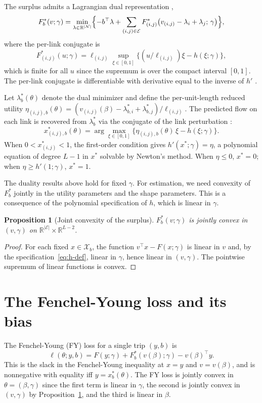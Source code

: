 \documentclass[12pt]{article}
\newcommand{\cN}{\mathcal{N}}
\newcommand{\cE}{\mathcal{E}}
\newcommand{\cX}{\mathcal{X}}
\newtheorem{proposition}{Proposition}
\begin{document}
The surplus admits a Lagrangian dual representation \citep[Theorem 2]{fosgerau_convex_2026},
\[
    F^*_b(v; \gamma) = \min_{\lambda \in \mathbb{R}^{|\cN|}}
    \Bigl\{ -b^\top \lambda + \sum_{(i,j) \in \cE}
    F^*_{(i,j)}\bigl(v_{(i,j)} - \lambda_i + \lambda_j;\,
    \gamma\bigr) \Bigr\},
\]
where the per-link conjugate is
\[
    F^*_{(i,j)}(u; \gamma)
    = \ell_{(i,j)} \sup_{\xi \in [0,1]} \bigl\{
        (u / \ell_{(i,j)})\xi - h(\xi; \gamma) \bigr\},
\]
which is finite for all $u$ since the supremum is over the compact interval $[0, 1]$. The per-link conjugate is differentiable with derivative equal to the inverse of $h'$ \citep[Lemma 1]{fosgerau_convex_2026}.

Let $\lambda^*_b(\theta)$ denote the dual minimizer and define the per-unit-length reduced utility $\eta_{(i,j),b}(\theta) = (v_{(i,j)}(\beta) - \lambda^*_{b,i} + \lambda^*_{b,j}) / \ell_{(i,j)}$. The predicted flow on each link is recovered from $\lambda^*_b$ via the conjugate of the link perturbation \citep[Theorem 3]{fosgerau_convex_2026}:
\[
    x^*_{(i,j),b}(\theta)
    = \arg\max_{\xi \in [0,1]} \bigl\{
        \eta_{(i,j),b}(\theta) \, \xi - h(\xi; \gamma) \bigr\}.
\]
When $0 < x^*_{(i,j)} < 1$, the first-order condition gives $h'(x^*; \gamma) = \eta$, a polynomial equation of degree $L - 1$ in $x^*$ solvable by Newton's method. When $\eta \leq 0$, $x^* = 0$; when $\eta \geq h'(1; \gamma)$, $x^* = 1$.

The duality results above hold for fixed $\gamma$. For estimation, we need convexity of $F^*_b$ jointly in the utility parameters and the shape parameters. This is a consequence of the polynomial specification of $h$, which is linear in $\gamma$.


\begin{proposition}[Joint convexity of the surplus]\label{prop:convex}
$F^*_b(v; \gamma)$ is jointly convex in $(v, \gamma)$ on $\mathbb{R}^{|\cE|} \times \mathbb{R}^{L-2}$.
\end{proposition}

\begin{proof}
For each fixed $x \in \cX_b$, the function $v^\top x - F(x; \gamma)$ is linear in $v$ and, by the specification~\eqref{eq:h-def}, linear in $\gamma$, hence linear in $(v, \gamma)$. The pointwise supremum of linear functions is convex.
\end{proof}



\section{The Fenchel-Young loss and its bias}\label{sec:FYloss_bias}
The Fenchel-Young (FY) loss for a single trip $(y, b)$ is
\[
    \ell(\theta; y, b) = F(y; \gamma) + F^*_b(v(\beta); \gamma)
        - v(\beta)^\top y.
\]
This is the slack in the Fenchel-Young inequality at $x = y$ and $v = v(\beta)$, and is nonnegative with equality iff $y = x^*_b(\theta)$. The FY loss is jointly convex in $\theta = (\beta, \gamma)$ since the first term is linear in $\gamma$, the second is jointly convex in $(v, \gamma)$ by Proposition~\ref{prop:convex}, and the third is linear in $\beta$.
\end{document}
